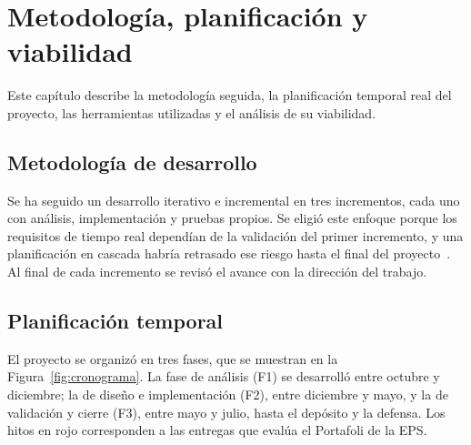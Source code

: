 \chapter{Metodología, planificación y viabilidad}
\label{cap:metodologia}

Este capítulo describe la metodología seguida, la planificación temporal real
del proyecto, las herramientas utilizadas y el análisis de su viabilidad.

\section{Metodología de desarrollo}
\label{sec:metodologia}

Se ha seguido un desarrollo iterativo e incremental en tres incrementos, cada
uno con análisis, implementación y pruebas propios. Se eligió este enfoque
porque los requisitos de tiempo real dependían de la validación del primer
incremento, y una planificación en cascada habría retrasado ese riesgo hasta el
final del proyecto~\cite{martin2022arquitectura}. Al final de cada incremento se
revisó el avance con la dirección del trabajo.

\section{Planificación temporal}
\label{sec:planificacion}

El proyecto se organizó en tres fases, que se muestran en la
Figura~\ref{fig:cronograma}. La fase de análisis (F1) se desarrolló entre
octubre y diciembre; la de diseño e implementación (F2), entre diciembre y
mayo, y la de validación y cierre (F3), entre mayo y julio, hasta el depósito y
la defensa. Los hitos en rojo corresponden a las entregas que evalúa el
Portafoli de la \ac{EPS}.

